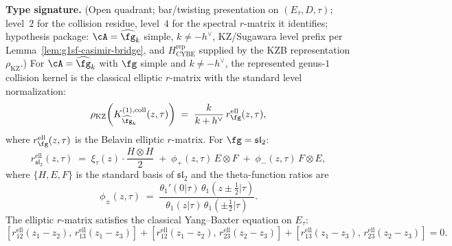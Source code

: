 \begin{theorem}
\label{thm:g1sf-face-5}
\textbf{Type signature.} (Open quadrant; bar/twisting presentation on
$(E_\tau, D, \tau)$; level~$2$ for the collision residue, level~$4$
for the spectral $r$-matrix it identifies; hypothesis package:
$\cA = \widehat{\fg}_k$ simple, $k\neq -h^\vee$,
KZ/Sugawara level prefix per Lemma~\ref{lem:g1sf-casimir-bridge},
and $H_{\mathrm{CYBE}}^{\mathrm{rep}}$ supplied by the KZB
representation $\rho_{\mathrm{KZ}}$.)
For $\cA = \widehat{\fg}_k$ with $\fg$ simple and
$k \neq -h^\vee$, the represented genus-$1$ collision kernel is the
classical elliptic $r$-matrix with the standard level normalization:
\begin{equation}\label{eq:g1sf-elliptic-rmatrix}
\rho_{\mathrm{KZ}}\!\left(
K_{\widehat{\fg}_k}^{(1),\mathrm{coll}}(z,\tau)\right)
\;=\;
\frac{k}{k + h^\vee}\,
r^{\mathrm{ell}}_\fg(z, \tau),
\end{equation}
where $r^{\mathrm{ell}}_\fg(z, \tau)$ is the Belavin elliptic
$r$-matrix. For $\fg = \mathfrak{sl}_2$:
\begin{equation}\label{eq:g1sf-sl2-elliptic}
r^{\mathrm{ell}}_{\mathfrak{sl}_2}(z, \tau)
\;=\;
\xi_\tau(z) \cdot \frac{H \otimes H}{2}
\;+\;
\phi_+(z, \tau)\, E \otimes F
\;+\;
\phi_-(z, \tau)\, F \otimes E,
\end{equation}
where $\{H, E, F\}$ is the standard basis of $\mathfrak{sl}_2$
and the theta-function ratios are
\begin{equation}\label{eq:g1sf-phi-pm}
\phi_\pm(z, \tau)
\;=\;
\frac{\theta_1'(0|\tau)\, \theta_1(z \pm \tfrac{1}{2}|\tau)}%
{\theta_1(z|\tau)\, \theta_1(\pm\tfrac{1}{2}|\tau)}.
\end{equation}
The elliptic $r$-matrix satisfies the classical Yang--Baxter equation
on $E_\tau$:
\begin{equation}\label{eq:g1sf-elliptic-cybe}
[r_{12}^{\mathrm{ell}}(z_1{-}z_2),\, r_{13}^{\mathrm{ell}}(z_1{-}z_3)]
+ [r_{12}^{\mathrm{ell}}(z_1{-}z_2),\, r_{23}^{\mathrm{ell}}(z_2{-}z_3)]
+ [r_{13}^{\mathrm{ell}}(z_1{-}z_3),\, r_{23}^{\mathrm{ell}}(z_2{-}z_3)]
= 0.
\end{equation}
\end{theorem}

